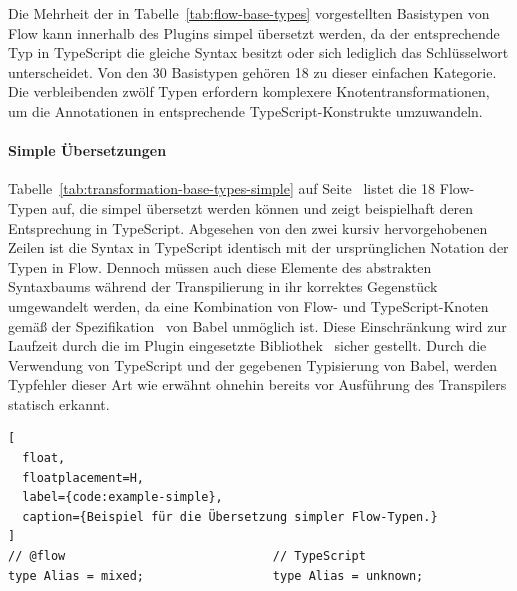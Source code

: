 {Die Mehrheit der in Tabelle~\ref{tab:flow-base-types} vorgestellten Basistypen von Flow kann innerhalb des Plugins simpel übersetzt werden, da der entsprechende Typ in TypeScript die gleiche Syntax besitzt oder sich lediglich das Schlüsselwort unterscheidet. Von den 30 Basistypen gehören 18 zu dieser einfachen Kategorie. Die verbleibenden zwölf Typen erfordern komplexere Knotentransformationen, um die Annotationen in entsprechende TypeScript-Konstrukte umzuwandeln.

\paragraph{Simple Übersetzungen}

Tabelle~\ref{tab:transformation-base-types-simple} auf Seite~\pageref{tab:transformation-base-types-simple} listet die 18 Flow-Typen auf, die simpel übersetzt werden können und zeigt beispielhaft deren Entsprechung in TypeScript. Abgesehen von den zwei kursiv hervorgehobenen Zeilen ist die Syntax in TypeScript identisch mit der ursprünglichen Notation der Typen in Flow. Dennoch müssen auch diese Elemente des abstrakten Syntaxbaums während der Transpilierung in ihr korrektes Gegenstück umgewandelt werden, da eine Kombination von Flow- und TypeScript-Knoten gemäß der Spezifikation~\autocite{BABEL:PARSER_SPEC} von Babel unmöglich ist. Diese Einschränkung wird zur Laufzeit durch die im Plugin eingesetzte Bibliothek \,\autocite{BABEL:TYPES} sicher gestellt. Durch die Verwendung von TypeScript und der gegebenen Typisierung von Babel, werden Typfehler dieser Art wie erwähnt ohnehin bereits vor Ausführung des Transpilers statisch erkannt.



\begin{lstlisting}[
  float,
  floatplacement=H,
  label={code:example-simple},
  caption={Beispiel für die Übersetzung simpler Flow-Typen.}
]
// @flow                             // TypeScript
type Alias = mixed;                  type Alias = unknown;
\end{lstlisting}

}
